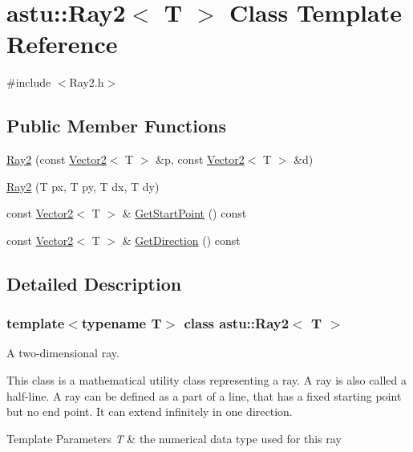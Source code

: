 \hypertarget{classastu_1_1Ray2}{}\section{astu\+:\+:Ray2$<$ T $>$ Class Template Reference}
\label{classastu_1_1Ray2}


{\ttfamily \#include $<$Ray2.\+h$>$}

\subsection*{Public Member Functions}
\begin{DoxyCompactItemize}
\item 
\hyperlink{classastu_1_1Ray2_a55a576b162700640ce6781c4585cd677}{Ray2} (const \hyperlink{classastu_1_1Vector2}{Vector2}$<$ T $>$ \&p, const \hyperlink{classastu_1_1Vector2}{Vector2}$<$ T $>$ \&d)
\item 
\hyperlink{classastu_1_1Ray2_a01a3a9ea21bf0e02c38c0e4bede6a5c6}{Ray2} (T px, T py, T dx, T dy)
\item 
const \hyperlink{classastu_1_1Vector2}{Vector2}$<$ T $>$ \& \hyperlink{classastu_1_1Ray2_a4fd8b77b411f464733cf41a0a8aa930e}{Get\+Start\+Point} () const
\item 
const \hyperlink{classastu_1_1Vector2}{Vector2}$<$ T $>$ \& \hyperlink{classastu_1_1Ray2_a3c51afb5095ba628a0b52e34f1e1e133}{Get\+Direction} () const
\end{DoxyCompactItemize}


\subsection{Detailed Description}
\subsubsection*{template$<$typename T$>$\newline
class astu\+::\+Ray2$<$ T $>$}

A two-\/dimensional ray.

This class is a mathematical utility class representing a ray. A ray is also called a half-\/line. A ray can be defined as a part of a line, that has a fixed starting point but no end point. It can extend infinitely in one direction.


\begin{DoxyTemplParams}{Template Parameters}
{\em T} & the numerical data type used for this ray \\
\hline
\end{DoxyTemplParams}


